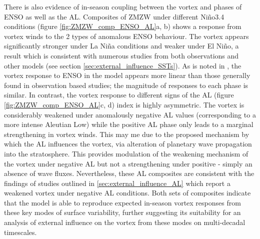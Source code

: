 There is also evidence of in-season coupling between the vortex and phases of ENSO as well as the AL. Composites of ZMZW under different Ni\~{n}o3.4 conditions (figure \ref{fig:ZMZW_comp_ENSO_AL}a, b) shows a response from vortex winds to the 2 types of anomalous ENSO behaviour. The vortex appears significantly stronger under La Ni\~{n}a conditions and weaker under El Ni\~{n}o, a result which is consistent with numerous studies from both observations and other models (see section \ref{sec:external_influence_SSTs}). As is noted in \cite{polvaniDistinguishing2017b}, the vortex response to ENSO in the model appears more linear than those generally found in observation based studies; the magnitude of responses to each phase is similar. In contrast, the vortex response to different signs of the AL (figure \ref{fig:ZMZW_comp_ENSO_AL}c, d) index is highly asymmetric. The vortex is considerably weakened under anomalously negative AL values (corresponding to a more intense Aleutian Low) while the positive AL phase only leads to a marginal strengthening in vortex winds. This may me due to the proposed mechanism by which the AL influences the vortex, via alteration of planetary wave propagation into the stratosphere. This provides modulation of the weakening mechanism of the vortex under negative AL but not a strengthening under positive - simply an absence of wave fluxes. Nevertheless, these AL composites are consistent with the findings of studies outlined in \ref{sec:external_influence_AL} which report a weakened vortex under negative AL conditions. Both sets of composites indicate that the model is able to reproduce expected in-season vortex responses from these key modes of surface variability, further suggesting its suitability for an analysis of external influence on the vortex from these modes on multi-decadal timescales. 

